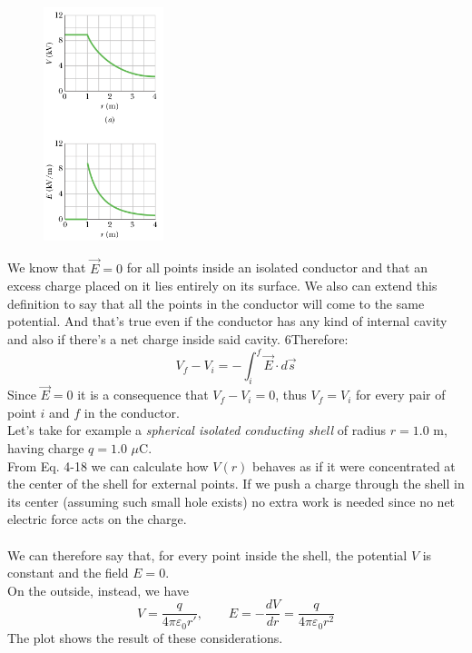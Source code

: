 \documentclass[12pt, a4paper]{article}
\begin{document}
		\begin{figure}
			\centering
			\includegraphics[width=3.5cm]{Physics2_PNGs/plot-charge-potential.png}
			\caption*{}
			\label{fig:plot-charge-potential.png}
		\end{figure}
		We know that $\vec{E} = 0$ for all points inside an isolated conductor and that an excess charge placed on it lies entirely on its surface. We also can extend this definition to say that all the points in the conductor will come to the same potential. And that's true even if the conductor has any kind of internal cavity and also if there's a net charge inside said cavity. 6Therefore:
		\begin{equation*}
			V_f - V_i = - \int_{i}^{f} \vec{E} \cdot d\vec{s}
		\end{equation*}
		Since $\vec{E} = 0$ it is a	consequence that $V_f - V_i = 0$, thus $V_f = V_i$ for every pair of point $i$ and $f$ in the conductor. \\
		Let's take for example a \textit{spherical isolated	conducting shell} of radius $r = 1.0$ m, having charge $q = 1.0$ $\mu$C. \\
		From Eq. 4-18 we can calculate how $V(r)$ behaves as if it were concentrated at the center of the shell for external points. If we push a charge through the shell in its center (assuming such small hole exists) no extra work is needed since no net electric force acts on the charge. \\ \\
		We can therefore say that, for every point inside the shell, the potential $V$ is constant and the field $E = 0$. \\
		On the outside, instead,  we have 
		\[
			V = \frac{q}{4 \pi \varepsilon_0 r'}, \quad \quad
			E = - \frac{dV}{dr} = \frac{q}{4 \pi \varepsilon_0 r^2}
		\]
		The plot shows the result of these considerations.
		
\end{document}
